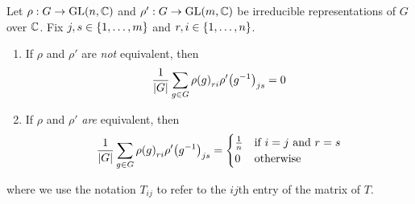 \begin{lemma}
    Let $\rho : G \to \operatorname{GL}\!\left( n, \mathbb{C} \right)$ and $\rho' : G \to \operatorname{GL}\!\left( m, \mathbb{C} \right)$ be irreducible representations of $G$ over $\mathbb{C}$. Fix $j, s \in \left\{ 1, \ldots, m \right\}$ and $r, i \in \left\{ 1, \ldots, n \right\}$.
    \begin{enumerate}[label = \normalfont \arabic*., noitemsep]
        \item If $\rho$ and $\rho'$ are \textit{not} equivalent, then
        \begin{align*}
            \frac{1}{\left\lvert G \right\rvert} \sum_{g \in G} {\rho(g)}_{ri} {\rho'\!\left( g^{-1} \right)}_{js} = 0
        \end{align*}

        \item If $\rho$ and $\rho'$ \textit{are} equivalent, then
        \begin{align*}
            \frac{1}{\left\lvert G \right\rvert} \sum_{g \in G} {\rho(g)}_{ri} {\rho'\!\left( g^{-1} \right)}_{js} =
            \begin{cases}
                \frac{1}{n} & \text{if } i = j \text{ and } r = s \\
                0 & \text{otherwise}
            \end{cases}
        \end{align*}
    \end{enumerate}
    where we use the notation $T_{ij}$ to refer to the $ij$th entry of the matrix of $T$.
\end{lemma}
